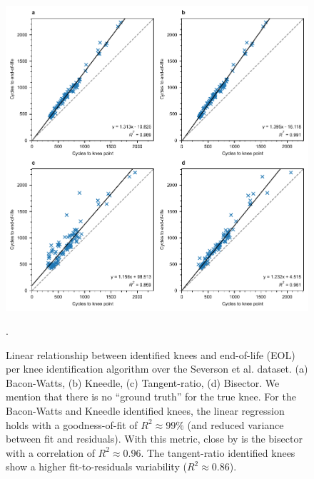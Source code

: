 \documentclass[journal=jpclcd,manuscript=article]{achemso}
\begin{document}
\begin{figure}[ht]
\centering
\includegraphics[scale=1.0]{final_figures/severson_knee_eol_all_algorithms.pdf}
\caption{Linear relationship between identified knees and end-of-life (EOL) per knee identification algorithm over the Severson et al. \cite{severson_data-driven_2019} dataset.
(a) Bacon-Watts\cite{fermin-cueto_identification_2020}{},
(b) Kneedle\cite{satopaa_finding_2011}{},
(c) Tangent-ratio\cite{diao_algorithm_2019}{},
(d) Bisector\cite{greenbank_automated_2021}{}.
We mention that there is no ``ground truth'' for the true knee. For the Bacon-Watts and Kneedle identified knees, the linear regression holds with a goodness-of-fit of $R^2\approx 99\%$ (and reduced variance between fit and residuals). With this metric, close by is the bisector\cite{greenbank_automated_2021} with a correlation of $R^2\approx 0.96$. The tangent-ratio\cite{diao_algorithm_2019} identified knees show a higher fit-to-residuals variability ($R^2\approx 0.86$).}.
\label{fig:severson_knee_eol_all_algorithms}
\end{figure}
\end{document}

